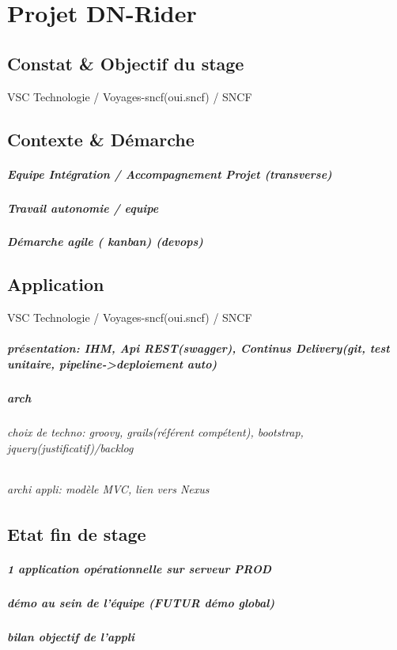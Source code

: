 \chapter{Projet DN-Rider}
\label{chap:Projet DN-Rider}

\section{Constat \& Objectif du stage} VSC Technologie / Voyages-sncf(oui.sncf) / SNCF

\section{Contexte \& Démarche}
\paragraph{Equipe Intégration / Accompagnement Projet (transverse)}
\paragraph{Travail autonomie / equipe}
\paragraph{Démarche agile ( kanban) (devops)}

\section{Application} VSC Technologie / Voyages-sncf(oui.sncf) / SNCF
\paragraph{présentation: IHM, Api REST(swagger), Continus Delivery(git, test unitaire, pipeline->deploiement auto)}
\paragraph{arch}
\subparagraph{choix de techno: groovy, grails(référent compétent), bootstrap, jquery(justificatif)/backlog}
\subparagraph{archi appli: modèle MVC, lien vers Nexus}

\section{Etat fin de stage}
\paragraph{1 application opérationnelle sur serveur PROD}
\paragraph{démo au sein de l’équipe (FUTUR démo global)}
\paragraph{bilan objectif de l’appli}

